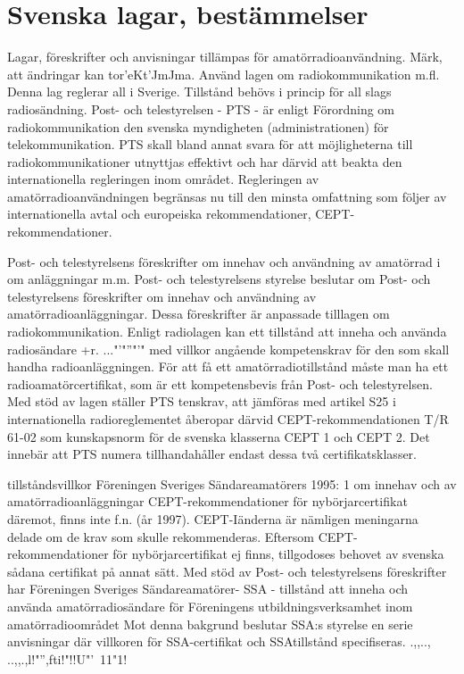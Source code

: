 %
%
%
%
%
%
\section{Svenska lagar, bestämmelser}

Lagar, föreskrifter och anvisningar
tillämpas för amatörradioanvändning.
Märk, att ändringar kan tor'eKt'JmJma.
Använd
lagen om radiokommunikation m.fl.
Denna lag reglerar all
i
Sverige. Tillstånd behövs i princip för all
slags radiosändning.
Post- och telestyrelsen - PTS - är enligt
Förordning om radiokommunikation den
svenska myndigheten (administrationen) för
telekommunikation. PTS skall bland annat
svara för att möjligheterna till radiokommunikationer utnyttjas effektivt och har därvid att
beakta den internationella regleringen inom
området. Regleringen av amatörradioanvändningen begränsas nu till den minsta
omfattning som följer av internationella avtal
och europeiska rekommendationer,
CEPT-rekommendationer.

Post- och telestyrelsens föreskrifter om
innehav och användning av amatörrad i om
anläggningar m.m.
Post- och telestyrelsens styrelse beslutar
om Post- och telestyrelsens föreskrifter om
innehav och användning av amatörradioanläggningar. Dessa föreskrifter är anpassade tilllagen om radiokommunikation.
Enligt radiolagen kan ett tillstånd att
inneha och använda radiosändare +r. ..."'"''"'"
med villkor angående kompetenskrav för
den som skall handha radioanläggningen.
För att få ett amatörradiotillstånd måste
man ha ett radioamatörcertifikat, som är ett
kompetensbevis från Post- och telestyrelsen. Med stöd av lagen ställer PTS
tenskrav, att jämföras med artikel S25 i
internationella radioreglementet
åberopar därvid CEPT-rekommendationen
T/R 61-02 som kunskapsnorm för de svenska klasserna CEPT 1 och CEPT 2.
Det innebär att PTS numera tillhandahåller endast dessa två certifikatsklasser.

tillståndsvillkor
Föreningen Sveriges Sändareamatörers
1995: 1 om innehav och
av amatörradioanläggningar
CEPT-rekommendationer för nybörjarcertifikat däremot, finns inte f.n. (år 1997).
CEPT-Iänderna är nämligen meningarna delade om de krav som skulle
rekommenderas. Eftersom CEPT-rekommendationer för nybörjarcertifikat ej finns,
tillgodoses behovet av svenska sådana certifikat på annat sätt.
Med stöd av Post- och telestyrelsens
föreskrifter har Föreningen Sveriges Sändareamatörer- SSA - tillstånd att inneha
och använda amatörradiosändare för Föreningens utbildningsverksamhet inom amatörradioområdet Mot denna bakgrund beslutar SSA:s styrelse en serie anvisningar
där villkoren för SSA-certifikat och SSAtillstånd specifiseras.
.,,.., ..,,.,l!"'',fti!"!!U"'\ 11"1!

